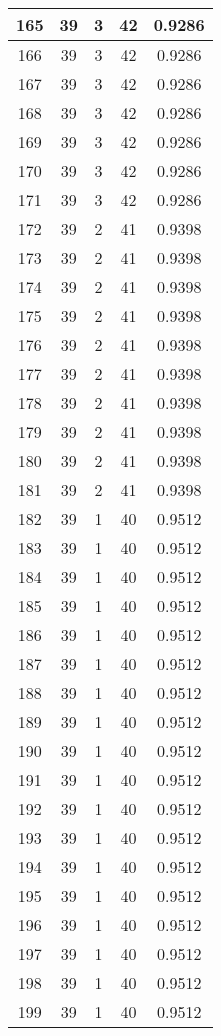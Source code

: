 \documentclass[letterpaper, 12pt]{article}
\begin{document}
\begin{longtable}{|c|c|c|c|c|}
\hline
165 & 39 & 3 & 42 & 0.9286 \\
\hline
166 & 39 & 3 & 42 & 0.9286 \\
\hline
167 & 39 & 3 & 42 & 0.9286 \\
\hline
168 & 39 & 3 & 42 & 0.9286 \\
\hline
169 & 39 & 3 & 42 & 0.9286 \\
\hline
170 & 39 & 3 & 42 & 0.9286 \\
\hline
171 & 39 & 3 & 42 & 0.9286 \\
\hline
172 & 39 & 2 & 41 & 0.9398 \\
\hline
173 & 39 & 2 & 41 & 0.9398 \\
\hline
174 & 39 & 2 & 41 & 0.9398 \\
\hline
175 & 39 & 2 & 41 & 0.9398 \\
\hline
176 & 39 & 2 & 41 & 0.9398 \\
\hline
177 & 39 & 2 & 41 & 0.9398 \\
\hline
178 & 39 & 2 & 41 & 0.9398 \\
\hline
179 & 39 & 2 & 41 & 0.9398 \\
\hline
180 & 39 & 2 & 41 & 0.9398 \\
\hline
181 & 39 & 2 & 41 & 0.9398 \\
\hline
182 & 39 & 1 & 40 & 0.9512 \\
\hline
183 & 39 & 1 & 40 & 0.9512 \\
\hline
184 & 39 & 1 & 40 & 0.9512 \\
\hline
185 & 39 & 1 & 40 & 0.9512 \\
\hline
186 & 39 & 1 & 40 & 0.9512 \\
\hline
187 & 39 & 1 & 40 & 0.9512 \\
\hline
188 & 39 & 1 & 40 & 0.9512 \\
\hline
189 & 39 & 1 & 40 & 0.9512 \\
\hline
190 & 39 & 1 & 40 & 0.9512 \\
\hline
191 & 39 & 1 & 40 & 0.9512 \\
\hline
192 & 39 & 1 & 40 & 0.9512 \\
\hline
193 & 39 & 1 & 40 & 0.9512 \\
\hline
194 & 39 & 1 & 40 & 0.9512 \\
\hline
195 & 39 & 1 & 40 & 0.9512 \\
\hline
196 & 39 & 1 & 40 & 0.9512 \\
\hline
197 & 39 & 1 & 40 & 0.9512 \\
\hline
198 & 39 & 1 & 40 & 0.9512 \\
\hline
199 & 39 & 1 & 40 & 0.9512 \\
\hline
\end{longtable}
\end{document}
